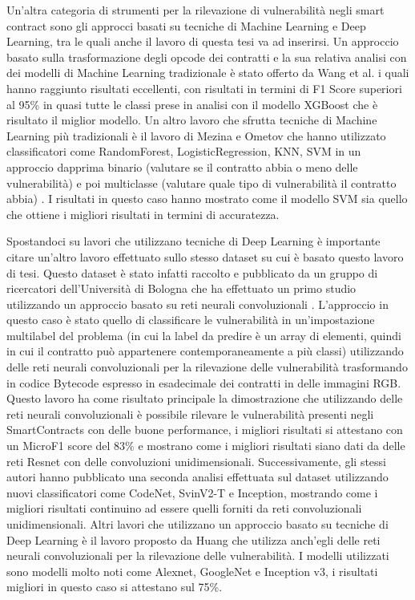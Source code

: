 \documentclass[../../Thesis.tex]{subfiles}
\begin{document}
Un'altra categoria di strumenti per la rilevazione di vulnerabilit\`a negli smart contract sono gli approcci basati su tecniche di Machine Learning e Deep Learning, tra le quali anche il lavoro di questa tesi va ad inserirsi. Un approccio basato sulla trasformazione degli opcode dei contratti e la sua relativa analisi con dei modelli di Machine Learning tradizionale \`e stato offerto da Wang et al. \cite{ContractWard} i quali hanno raggiunto risultati eccellenti, con risultati in termini di F1 Score superiori al 95\% in quasi tutte le classi prese in analisi con il modello XGBoost che \`e risultato il miglior modello. Un altro lavoro che sfrutta tecniche di Machine Learning pi\`u tradizionali \`e il lavoro di Mezina e Ometov che hanno utilizzato classificatori come RandomForest, LogisticRegression, KNN, SVM in un approccio dapprima binario (valutare se il contratto abbia o meno delle vulnerabilit\`a) e poi multiclasse (valutare quale tipo di vulnerabilit\`a il contratto abbia) \cite{Mezina}. I risultati in questo caso hanno mostrato come il modello SVM sia quello che ottiene i migliori risultati in termini di accuratezza. 

Spostandoci su lavori che utilizzano tecniche di Deep Learning \`e importante citare un'altro lavoro effettuato sullo stesso dataset su cui \`e basato questo lavoro di tesi. Questo dataset \`e stato infatti raccolto e pubblicato da un gruppo di ricercatori dell'Universit\`a di Bologna che ha effettuato un primo studio utilizzando un approccio basato su reti neurali convoluzionali \cite{RossiniPaper1}. L'approccio in questo caso \`e stato quello di classificare le vulnerabilit\`a in un'impostazione multilabel del problema (in cui la label da predire \`e un array di elementi, quindi in cui il contratto pu\`o appartenere contemporaneamente a pi\`u classi) utilizzando delle reti neurali convoluzionali per la rilevazione delle vulnerabilit\`a trasformando in codice Bytecode espresso in esadecimale dei contratti in delle immagini RGB. Questo lavoro ha  come risultato principale la dimostrazione che utilizzando delle reti neurali convoluzionali \`e possibile rilevare le vulnerabilit\`a presenti negli SmartContracts con delle buone performance, i migliori risultati si attestano con un MicroF1 score del 83\% e mostrano come i migliori risultati siano dati da delle reti Resnet con delle convoluzioni unidimensionali. Successivamente, gli stessi autori hanno pubblicato una seconda analisi effettuata sul dataset utilizzando nuovi classificatori come CodeNet, SvinV2-T e Inception, mostrando come i migliori risultati  continuino ad essere quelli forniti da reti convoluzionali unidimensionali. Altri lavori che utilizzano un approccio basato su tecniche di Deep Learning \`e il lavoro proposto da Huang \cite{Huang} che utilizza anch'egli delle reti neurali convoluzionali per la rilevazione delle vulnerabilit\`a. I modelli utilizzati sono modelli molto noti come Alexnet, GoogleNet e Inception v3, i risultati migliori in questo caso si attestano sul 75\%.
\end{document}
